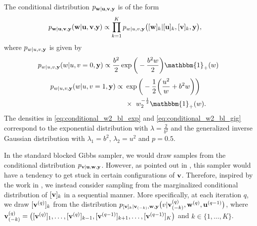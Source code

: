\documentclass[journal]{IEEEtran}
\begin{document}
The conditional distribution $p_{{\bf{w}} | {\bf{u}}, {\bf{v}}, {\bf{y}}}$ is of the form
\begin{align}
    p_{{\bf{w}} | {\bf{u}}, {\bf{v}}, {\bf{y}}}({\bf{w}} | {\bf{u}}, {\bf{v}}, &{\bf{y}}) \propto \prod_{k=1}^{K} p_{w|u, v, {\bf{y}}}\big([{\bf{w}}]_k|[{\bf{u}}]_k, [{\bf{v}}]_k, {\bf{y}} \big), 
\end{align} 
where $p_{w|u, v, {\bf{y}}}$ is given by
\begin{equation}\label{eq:conditional_w2_bl_exp}
    p_{w|u, v, \M y}(w|u, v=0, \M y) \propto \frac{b^2}{2}\exp\bigg(-\frac{b^2 w}{2}\bigg) \mathbbm{1}_{+}(w)
\end{equation}
\begin{align}\label{eq:conditional_w2_bl_gig}
    p_{w|u, v, \M y}(w|u, v=1, \M y) \propto \ &\exp\bigg(-\frac{1}{2}\bigg(\frac{u^2}{w} + b^2 w\bigg)\bigg) \nonumber \\
    &\times \ w_2^{-\frac{1}{2}} \mathbbm{1}_{+}(w).
\end{align}
The densities in \eqref{eq:conditional_w2_bl_exp} and \eqref{eq:conditional_w2_bl_gig} correspond to the exponential distribution with $\lambda = \frac{2}{b^2}$ and the generalized inverse Gaussian distribution with $\lambda_1 = b^2$, $\lambda_2 = u^2$ and $p = 0.5$.

In the standard blocked Gibbs sampler, we would draw samples from the conditional distribution $p_{{\bf{v}} | {\bf{u}}, {\bf{w}}, {\bf{y}}}$. However, as pointed out in \cite{ge2011enhanced}, this sampler would have a tendency to get stuck in certain configurations of ${\bf{v}}$. Therefore, inspired by the work in \cite{ge2011enhanced}, we instead consider sampling from the marginalized conditional distribution of $[{\bf{v}}]_k$ in a sequential manner. More specifically, at each iteration $q$, we draw $[{\bf{v}}^{(q)}]_k$ from the distribution $p_{[{\bf{v}}]_k | {\bf{v}}_{(-k)}, {\bf{w}}, {\bf{y}}}\big(v | {\bf{v}}_{(-k)}^{(q)}, {\bf{w}}^{(q)}, {\bf{u}}^{(q-1)}\big)$, where ${\bf{v}}_{(-k)}^{(q)} = \big([{\bf{v}}^{(q)}]_{1}, \ldots, [{\bf{v}}^{(q)}]_{k-1}, [{\bf{v}}^{(q-1)}]_{k+1}, \ldots, [{\bf{v}}^{(q-1)}]_{K} \big)$ and $k \in \{1, \ldots, K\}$.
\end{document}
